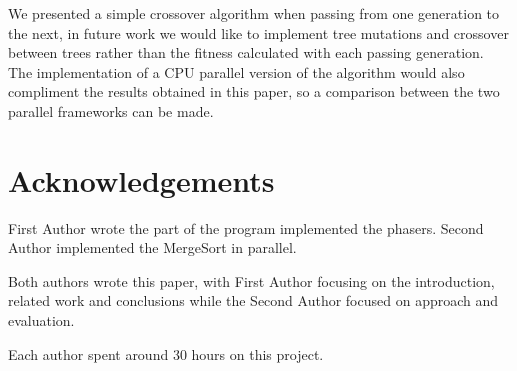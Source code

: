 \documentclass[runningheads]{llncs}
\begin{document}
We presented a simple crossover algorithm when passing from one generation to the next, in future work we would like to implement tree mutations and crossover between trees rather than the fitness calculated with each passing generation. The implementation of a CPU parallel version of the algorithm would also compliment the results obtained in this paper, so a comparison between the two parallel frameworks can be made.

\section*{Acknowledgements}

First Author wrote the part of the program implemented the phasers. Second Author implemented the MergeSort in parallel. 

Both authors wrote this paper, with First Author focusing on the introduction, related work and conclusions while the Second Author focused on approach and evaluation.

Each author spent around 30 hours on this project.



\end{document}
